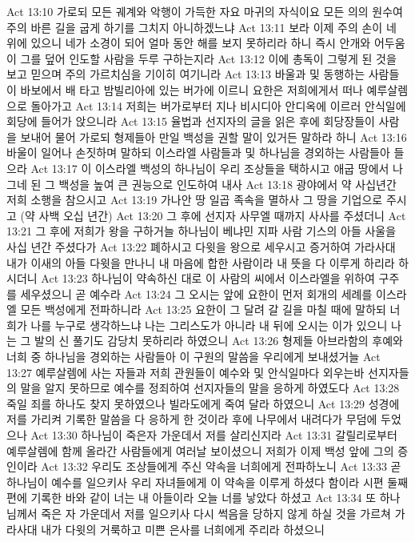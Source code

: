 Act 13:10  가로되 모든 궤계와 악행이 가득한 자요 마귀의 자식이요 모든 의의 원수여 주의 바른 길을 굽게 하기를 그치지 아니하겠느냐
Act 13:11  보라 이제 주의 손이 네 위에 있으니 네가 소경이 되어 얼마 동안 해를 보지 못하리라 하니 즉시 안개와 어두움이 그를 덮어 인도할 사람을 두루 구하는지라
Act 13:12  이에 총독이 그렇게 된 것을 보고 믿으며 주의 가르치심을 기이히 여기니라
Act 13:13  바울과 및 동행하는 사람들이 바보에서 배 타고 밤빌리아에 있는 버가에 이르니 요한은 저희에게서 떠나 예루살렘으로 돌아가고
Act 13:14  저희는 버가로부터 지나 비시디아 안디옥에 이르러 안식일에 회당에 들어가 앉으니라
Act 13:15  율법과 선지자의 글을 읽은 후에 회당장들이 사람을 보내어 물어 가로되 형제들아 만일 백성을 권할 말이 있거든 말하라 하니
Act 13:16  바울이 일어나 손짓하며 말하되 이스라엘 사람들과 및 하나님을 경외하는 사람들아 들으라
Act 13:17  이 이스라엘 백성의 하나님이 우리 조상들을 택하시고 애굽 땅에서 나그네 된 그 백성을 높여 큰 권능으로 인도하여 내사
Act 13:18  광야에서 약 사십년간 저희 소행을 참으시고
Act 13:19  가나안 땅 일곱 족속을 멸하사 그 땅을 기업으로 주시고 (약 사백 오십 년간)
Act 13:20  그 후에 선지자 사무엘 때까지 사사를 주셨더니
Act 13:21  그 후에 저희가 왕을 구하거늘 하나님이 베냐민 지파 사람 기스의 아들 사울을 사십 년간 주셨다가
Act 13:22  폐하시고 다윗을 왕으로 세우시고 증거하여 가라사대 내가 이새의 아들 다윗을 만나니 내 마음에 합한 사람이라 내 뜻을 다 이루게 하리라 하시더니
Act 13:23  하나님이 약속하신 대로 이 사람의 씨에서 이스라엘을 위하여 구주를 세우셨으니 곧 예수라
Act 13:24  그 오시는 앞에 요한이 먼저 회개의 세례를 이스라엘 모든 백성에게 전파하니라
Act 13:25  요한이 그 달려 갈 길을 마칠 때에 말하되 너희가 나를 누구로 생각하느냐 나는 그리스도가 아니라 내 뒤에 오시는 이가 있으니 나는 그 발의 신 풀기도 감당치 못하리라 하였으니
Act 13:26  형제들 아브라함의 후예와 너희 중 하나님을 경외하는 사람들아 이 구원의 말씀을 우리에게 보내셨거늘
Act 13:27  예루살렘에 사는 자들과 저희 관원들이 예수와 및 안식일마다 외우는바 선지자들의 말을 알지 못하므로 예수를 정죄하여 선지자들의 말을 응하게 하였도다
Act 13:28  죽일 죄를 하나도 찾지 못하였으나 빌라도에게 죽여 달라 하였으니
Act 13:29  성경에 저를 가리켜 기록한 말씀을 다 응하게 한 것이라 후에 나무에서 내려다가 무덤에 두었으나
Act 13:30  하나님이 죽은자 가운데서 저를 살리신지라
Act 13:31  갈릴리로부터 예루살렘에 함께 올라간 사람들에게 여러날 보이셨으니 저희가 이제 백성 앞에 그의 증인이라
Act 13:32  우리도 조상들에게 주신 약속을 너희에게 전파하노니
Act 13:33  곧 하나님이 예수를 일으키사 우리 자녀들에게 이 약속을 이루게 하셨다 함이라 시편 둘째 편에 기록한 바와 같이 너는 내 아들이라 오늘 너를 낳았다 하셨고
Act 13:34  또 하나님께서 죽은 자 가운데서 저를 일으키사 다시 썩음을 당하지 않게 하실 것을 가르쳐 가라사대 내가 다윗의 거룩하고 미쁜 은사를 너희에게 주리라 하셨으니
